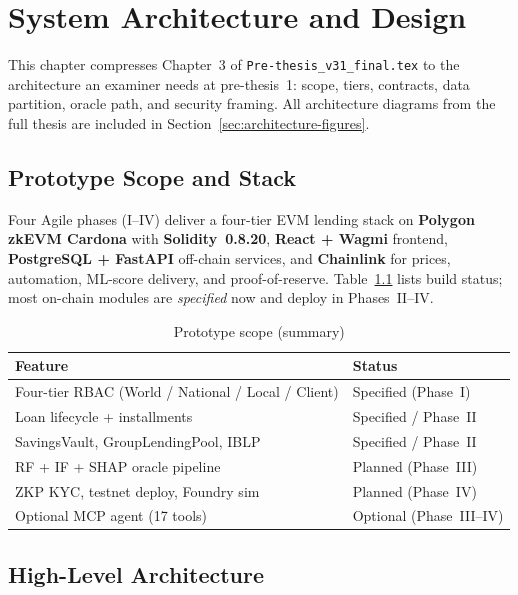 \documentclass[12pt, a4paper]{report}
\newcommand{\tableheadcolor}{\rowcolor{TableHeadBg}}
\newcommand{\tableheadfont}{\bfseries}
\begin{document}
\chapter{System Architecture and Design}
\label{ch:architecture-compressed}

This chapter compresses Chapter~3 of \texttt{Pre-thesis\_v31\_final.tex} to the architecture an examiner needs at pre-thesis~1: scope, tiers, contracts, data partition, oracle path, and security framing. All architecture diagrams from the full thesis are included in Section~\ref{sec:architecture-figures}.

\section{Prototype Scope and Stack}
\label{sec:prototype-scope}

Four Agile phases (I--IV) deliver a four-tier EVM lending stack on \textbf{Polygon zkEVM Cardona} with \textbf{Solidity~0.8.20}, \textbf{React + Wagmi} frontend, \textbf{PostgreSQL + FastAPI} off-chain services, and \textbf{Chainlink} for prices, automation, ML-score delivery, and proof-of-reserve. Table~\ref{tab:prototype-scope} lists build status; most on-chain modules are \textit{specified} now and deploy in Phases~II--IV.

\begin{table}[H]
\centering
\caption[Prototype scope (summary)]{Prototype scope (summary)}
\label{tab:prototype-scope}
\footnotesize
\begin{tabular}{@{}p{7.2cm}>{\raggedleft\arraybackslash}p{5.5cm}@{}}
\toprule
\tableheadcolor
\tableheadfont Feature & \tableheadfont Status \\
\midrule
Four-tier RBAC (World / National / Local / Client) & Specified (Phase~I) \\
Loan lifecycle + installments & Specified / Phase~II \\
SavingsVault, GroupLendingPool, IBLP & Specified / Phase~II \\
RF + IF + SHAP oracle pipeline & Planned (Phase~III) \\
ZKP KYC, testnet deploy, Foundry sim & Planned (Phase~IV) \\
Optional MCP agent (17 tools) & Optional (Phase~III--IV) \\
\bottomrule
\end{tabular}
\end{table}

\section{High-Level Architecture}
\label{sec:high-level-arch}
\end{document}
